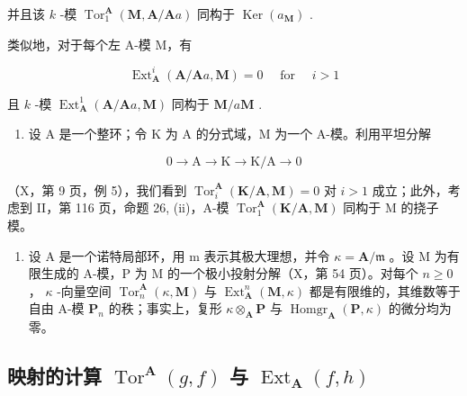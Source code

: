 并且该 \(k\) -模 \(\operatorname{Tor}_1^{\mathbf{A}}(\mathbf{M}, \mathbf{A} / \mathbf{A}a)\) 同构于 \(\operatorname{Ker}(a_{\mathbf{M}})\) .

类似地，对于每个左 A-模 M，有

\[
\operatorname{Ext} _ {\mathbf {A}} ^ {i} (\mathbf {A} / \mathbf {A} a, \mathbf {M}) = 0 \quad \text { for } \quad i > 1
\]

且 \(k\) -模 \(\operatorname{Ext}_{\mathbf{A}}^{1}(\mathbf{A}/\mathbf{A}a, \mathbf{M})\) 同构于 \(\mathbf{M}/a\mathbf{M}\) .

\begin{enumerate}
\def\labelenumi{\arabic{enumi})}
\setcounter{enumi}{1}
\tightlist
\item
  设 A 是一个整环；令 K 为 A 的分式域，M 为一个 A-模。利用平坦分解
\end{enumerate}

\[
0 \rightarrow \mathrm{A} \rightarrow \mathrm{K} \rightarrow \mathrm{K} / \mathrm{A} \rightarrow 0
\]

（X，第 9 页，例 5），我们看到 \(\operatorname{Tor}_{i}^{\mathbf{A}}(\mathbf{K}/\mathbf{A}, \mathbf{M}) = 0\) 对 \(i > 1\) 成立；此外，考虑到 II，第 116 页，命题 26, (ii)，A-模 \(\operatorname{Tor}_{1}^{\mathbf{A}}(\mathbf{K}/\mathbf{A}, \mathbf{M})\) 同构于 M 的挠子模。

\begin{enumerate}
\def\labelenumi{\arabic{enumi})}
\setcounter{enumi}{2}
\tightlist
\item
  设 A 是一个诺特局部环，用 m 表示其极大理想，并令 \(\kappa = \mathbf{A} / \mathfrak{m}\) 。设 M 为有限生成的 A-模，P 为 M 的一个极小投射分解（X，第 54 页）。对每个 \(n \geqslant 0\) ， \(\kappa\) -向量空间 \(\operatorname{Tor}_n^{\mathbf{A}}(\kappa, \mathbf{M})\) 与 \(\operatorname{Ext}_{\mathbf{A}}^{n}(\mathbf{M}, \kappa)\) 都是有限维的，其维数等于自由 A-模 \(\mathbf{P}_n\) 的秩；事实上，复形 \(\kappa \otimes_{\mathbf{A}} \mathbf{P}\) 与 \(\operatorname{Homgr}_{\mathbf{A}}(\mathbf{P}, \kappa)\) 的微分均为零。
\end{enumerate}

\subsection{\texorpdfstring{映射的计算 \(\operatorname{Tor}^{\mathbf{A}}(g, f)\) 与 \(\operatorname{Ext}_{\mathbf{A}}(f, h)\)}{映射的计算 \textbackslash operatorname\{Tor\}\^{}\{\textbackslash mathbf\{A\}\}(g, f) 与 \textbackslash operatorname\{Ext\}\_\{\textbackslash mathbf\{A\}\}(f, h)}}

